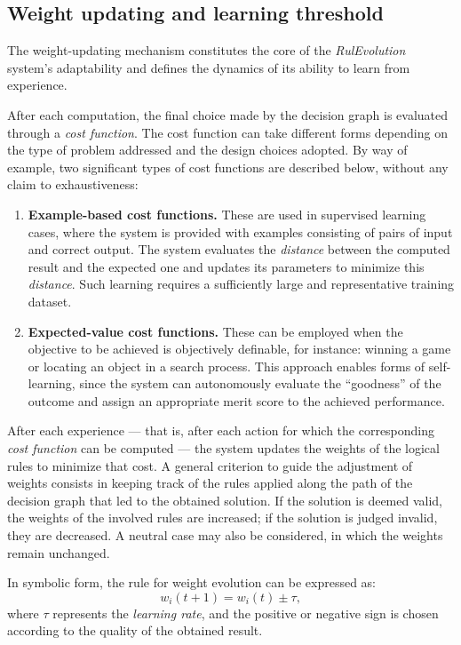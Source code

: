 \documentclass[12pt,a4paper]{article}
\begin{document}
\subsection{Weight updating and learning threshold}
The weight-updating mechanism constitutes the core of the \textit{RulEvolution} system’s adaptability and defines the dynamics of its ability to learn from experience.

After each computation, the final choice made by the decision graph is evaluated through a \textit{cost function}.  
The cost function can take different forms depending on the type of problem addressed and the design choices adopted.  
By way of example, two significant types of cost functions are described below, without any claim to exhaustiveness:

\begin{enumerate}[label=\alph*)]
\item \textbf{Example-based cost functions.}  
   These are used in supervised learning cases, where the system is provided with examples consisting of pairs of input and correct output.  
   The system evaluates the \textit{distance} between the computed result and the expected one and updates its parameters to minimize this \textit{distance}.  
   Such learning requires a sufficiently large and representative training dataset.

\item \textbf{Expected-value cost functions.}  
   These can be employed when the objective to be achieved is objectively definable, for instance: winning a game or locating an object in a search process.  
   This approach enables forms of self-learning, since the system can autonomously evaluate the “goodness” of the outcome and assign an appropriate merit score to the achieved performance.
\end{enumerate}

After each experience — that is, after each action for which the corresponding \textit{cost function} can be computed — the system updates the weights of the logical rules to minimize that cost.  
A general criterion to guide the adjustment of weights consists in keeping track of the rules applied along the path of the decision graph that led to the obtained solution.  
If the solution is deemed valid, the weights of the involved rules are increased; if the solution is judged invalid, they are decreased.  
A neutral case may also be considered, in which the weights remain unchanged.

In symbolic form, the rule for weight evolution can be expressed as:
\[
w_i(t+1) = w_i(t) \pm \tau,
\]
where $\tau$ represents the \textit{learning rate}, and the positive or negative sign is chosen according to the quality of the obtained result.
\end{document}
